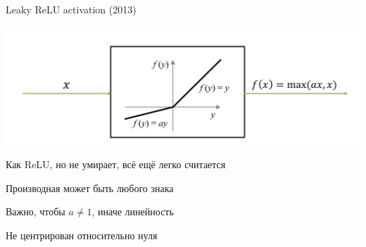 \documentclass[notes,12pt, aspectratio=169]{beamer}
\begin{document}
\begin{frame}{Leaky ReLU activation (2013)}
\begin{center}
\includegraphics[width=.8\linewidth]{leaky_relu_activation.png}
\end{center}

\begin{itemize}
{ \color{green} 
\item Как ReLU, но не умирает, всё ещё легко считается
\item Производная может быть любого знака
\item Важно, чтобы $a \ne 1$, иначе линейность} 
{\color{red} 
\item  Не центрирован относительно нуля} 
\end{itemize}
\end{frame}
\end{document}
